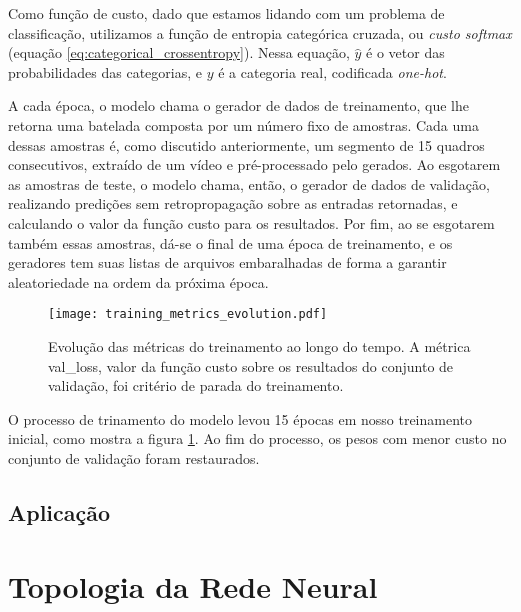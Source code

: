 Como função de custo, dado que estamos lidando com um problema de classificação, utilizamos a função de entropia categórica cruzada, ou \textit{custo softmax} (equação \ref{eq:categorical_crossentropy}). Nessa equação, $\hat{y}$ é o vetor das probabilidades das categorias, e $y$ é a categoria real, codificada \textit{one-hot}.

A cada época, o modelo chama o gerador de dados de treinamento, que lhe retorna uma batelada composta por um número fixo de amostras. Cada uma dessas amostras é, como discutido anteriormente, um segmento de 15 quadros consecutivos, extraído de um vídeo e pré-processado pelo gerados. Ao esgotarem as amostras de teste, o modelo chama, então, o gerador de dados de validação, realizando predições sem retropropagação sobre as entradas retornadas, e calculando o valor da função custo para os resultados. Por fim, ao se esgotarem também essas amostras, dá-se o final de uma época de treinamento, e os geradores tem suas listas de arquivos embaralhadas de forma a garantir aleatoriedade na ordem da próxima época.

\begin{figure}[ht]
    \centering
    \texttt{[image: training\_metrics\_evolution.pdf]}
    \caption{Evolução das métricas do treinamento ao longo do tempo. A métrica val\_loss, valor da função custo sobre os resultados do conjunto de validação, foi critério de parada do treinamento.}
    \label{fig:train_metrics_evo}
\end{figure}

O processo de trinamento do modelo levou 15 épocas em nosso treinamento inicial, como mostra a figura \ref{fig:train_metrics_evo}. Ao fim do processo, os pesos com menor custo no conjunto de validação foram restaurados.

\subsection{Aplicação}
\label{subsec:application}

% 


\section{Topologia da Rede Neural}
\label{sec:topology}

